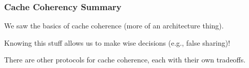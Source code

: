 \begin{frame}
  \frametitle{Cache Coherency Summary}
  
We saw the basics of cache coherence (more of an architecture
      thing).
      
Knowing this stuff allows us to make wise decisions (e.g., false sharing)!      
      
There are other protocols for cache coherence, each with their own
      tradeoffs.


  
\end{frame}





